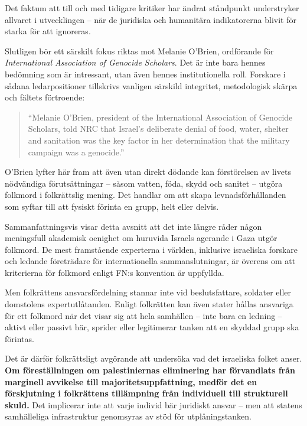 Det faktum att till och med tidigare kritiker har ändrat ståndpunkt understryker allvaret i utvecklingen – när de juridiska och humanitära indikatorerna blivit för starka för att ignoreras.

Slutligen bör ett särskilt fokus riktas mot Melanie O’Brien, ordförande för \textit{International Association of Genocide Scholars}. Det är inte bara hennes bedömning som är intressant, utan även hennes institutionella roll. Forskare i sådana ledarpositioner tillskrivs vanligen särskild integritet, metodologisk skärpa och fältets förtroende:

\begin{quote}
“Melanie O’Brien, president of the International Association of Genocide Scholars, told NRC that Israel’s deliberate denial of food, water, shelter and sanitation was the key factor in her determination that the military campaign was a genocide.”
\end{quote}

O’Brien lyfter här fram att även utan direkt dödande kan förstörelsen av livets nödvändiga förutsättningar – såsom vatten, föda, skydd och sanitet – utgöra folkmord i folkrättslig mening. Det handlar om att skapa levnadsförhållanden som syftar till att fysiskt förinta en grupp, helt eller delvis.

Sammanfattningsvis visar detta avsnitt att det inte längre råder någon meningsfull akademisk oenighet om huruvida Israels agerande i Gaza utgör folkmord. De mest framstående experterna i världen, inklusive israeliska forskare och ledande företrädare för internationella sammanslutningar, är överens om att kriterierna för folkmord enligt FN:s konvention är uppfyllda.

Men folkrättens ansvarsfördelning stannar inte vid beslutsfattare, soldater eller domstolens expertutlåtanden. Enligt folkrätten kan även stater hållas ansvariga för ett folkmord när det visar sig att hela samhällen – inte bara en ledning – aktivt eller passivt bär, sprider eller legitimerar tanken att en skyddad grupp ska förintas.


Det är därför folkrättsligt avgörande att undersöka vad det israeliska folket anser. 
\textbf{Om föreställningen om palestiniernas eliminering har förvandlats från marginell avvikelse till majoritetsuppfattning, medför det en förskjutning i folkrättens tillämpning från individuell till strukturell skuld.} 
Det implicerar inte att varje individ bär juridiskt ansvar – men att statens samhälleliga infrastruktur genomsyras av stöd för utplåningstanken.


